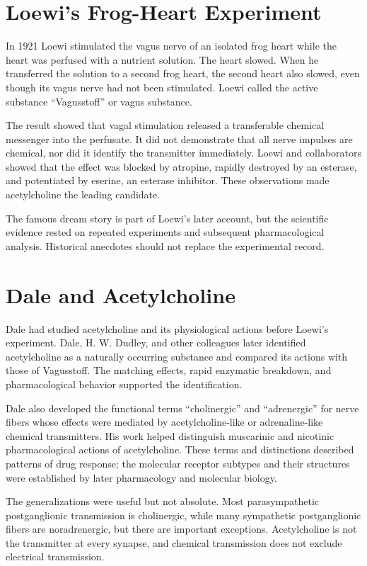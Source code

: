 \section{Loewi's Frog-Heart Experiment}

In 1921 Loewi stimulated the vagus nerve of an isolated frog heart while the heart was perfused with a nutrient solution. The heart slowed. When he transferred the solution to a second frog heart, the second heart also slowed, even though its vagus nerve had not been stimulated. Loewi called the active substance ``Vagusstoff'' or vagus substance.

The result showed that vagal stimulation released a transferable chemical messenger into the perfusate. It did not demonstrate that all nerve impulses are chemical, nor did it identify the transmitter immediately. Loewi and collaborators showed that the effect was blocked by atropine, rapidly destroyed by an esterase, and potentiated by eserine, an esterase inhibitor. These observations made acetylcholine the leading candidate.

The famous dream story is part of Loewi's later account, but the scientific evidence rested on repeated experiments and subsequent pharmacological analysis. Historical anecdotes should not replace the experimental record.

\section{Dale and Acetylcholine}

Dale had studied acetylcholine and its physiological actions before Loewi's experiment. Dale, H. W. Dudley, and other colleagues later identified acetylcholine as a naturally occurring substance and compared its actions with those of Vagusstoff. The matching effects, rapid enzymatic breakdown, and pharmacological behavior supported the identification.

Dale also developed the functional terms ``cholinergic'' and ``adrenergic'' for nerve fibers whose effects were mediated by acetylcholine-like or adrenaline-like chemical transmitters. His work helped distinguish muscarinic and nicotinic pharmacological actions of acetylcholine. These terms and distinctions described patterns of drug response; the molecular receptor subtypes and their structures were established by later pharmacology and molecular biology.

The generalizations were useful but not absolute. Most parasympathetic postganglionic transmission is cholinergic, while many sympathetic postganglionic fibers are noradrenergic, but there are important exceptions. Acetylcholine is not the transmitter at every synapse, and chemical transmission does not exclude electrical transmission.


